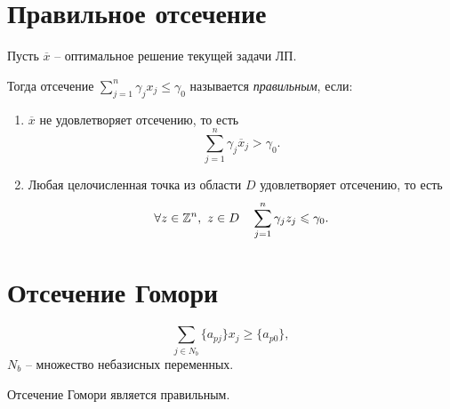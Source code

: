 \section{Правильное отсечение}

\begin{definition}
	Пусть $\overline{x}$ -- оптимальное решение текущей задачи ЛП.

	Тогда отсечение $\sum_{j=1}^{n} \gamma_j x_j \leqslant \gamma_0$ называется \emph{правильным}, если:
	\begin{enumerate}
		\item $\overline{x}$ не удовлетворяет отсечению, то есть
		      \[
			      \sum_{j=1}^{n} \gamma_j \overline{x}_j > \gamma_0.
		      \]
		\item Любая целочисленная точка из области $D$ удовлетворяет отсечению, то есть
		      \[
			      \forall z \in \mathbb{Z}^n, \ z \in D \quad \sum_{j=1}^{n} \gamma_j z_j \leqslant \gamma_0.
		      \]
	\end{enumerate}
\end{definition}

\section{Отсечение Гомори}

\begin{definition}
  \[
    \sum_{j \in N_b} \{a_{pj}\}x_j \geqslant \{a_{p0}\},
  \]
  $N_b$ -- множество небазисных переменных.
\end{definition}

\begin{theorem}
  Отсечение Гомори является правильным.
\end{theorem}
